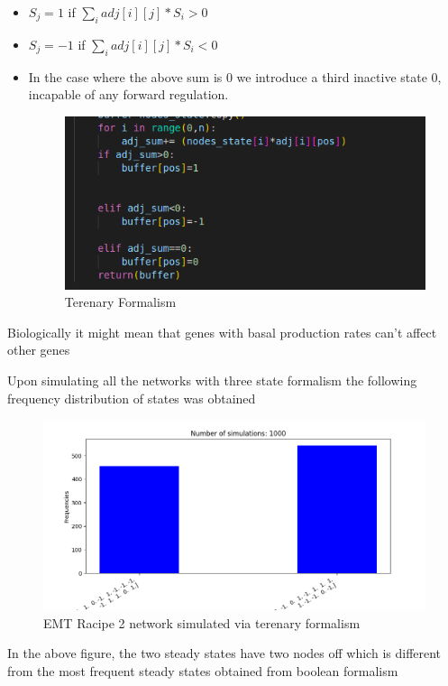\documentclass{article}
\begin{document}
\begin{itemize}

 	\item $ S_j = 1 $ if    $  \sum_{ i } ^ { } adj[i][j] * S_i> 0 $ 

	\item $ S_j = -1 $ if    $  \sum_{ i } ^ { } adj[i][j] * S_i< 0 $

	\item In the case where the above sum is 0 we introduce a third inactive state 0, incapable of any forward regulation. 
		
		\begin{figure}\centering
		\includegraphics[scale=0.4]{img/terenary_formalism.png}
		\caption{Terenary Formalism}
		\end{figure}
\end{itemize}

Biologically it might mean that genes with basal production rates can't affect other genes

Upon simulating all the networks with three state formalism the following frequency distribution of states was obtained 



\begin{figure}[H]
	\centering\includegraphics[scale=0.4]{img/emtracipe2ternaryssf.png}
	\caption{EMT Racipe 2 network simulated via terenary formalism}
\end{figure}
In the above figure, the two steady states have two nodes off which is different from the most frequent steady states obtained from boolean formalism 
\end{document}
